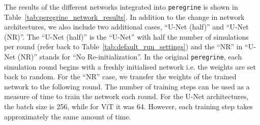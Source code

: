 The results of the different networks integrated into \texttt{peregrine} is shown in Table~\ref{tab:peregrine_network_results}. In addition to the change in network architectures, we also include two additional cases, \enquote{U-Net (half)} and \enquote{U-Net (NR)}. The \enquote{U-Net (half)} is the \enquote{U-Net} with half the number of simulations per round (refer back to Table~\ref{tab:default_run_settings}) and the \enquote{NR} in \enquote{U-Net (NR)} stands for \enquote{No Re-initialization}. In the original \texttt{peregrine}, each simulation round begins with a freshly initialised network i.e. the weights are set back to random. For the \enquote{NR} case, we transfer the weights of the trained network to the following round. The number of training steps can be used as a measure of time to train the network each round. For the U-Net architectures, the batch size is 256, while for ViT it was 64. However, each training step takes approximately the same amount of time.

